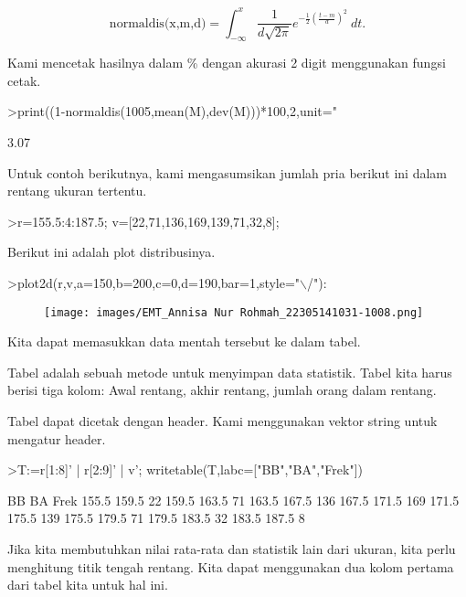 \documentclass[a4paper,10pt]{article}
\begin{document}
\begin{eulernotebook}
\begin{eulercomment}
\begin{eulercomment}
\begin{eulercomment}
\begin{eulercomment}
\begin{eulercomment}
\end{eulercomment}
\begin{eulerformula}
\[
\text{normaldis(x,m,d)}=\int_{-\infty}^x \frac{1}{d\sqrt{2\pi}}e^{-\frac{1}{2}(\frac{t-m}{d})^2}\ dt.
\]
\end{eulerformula}
\begin{eulercomment}
Kami mencetak hasilnya dalam \% dengan akurasi 2 digit menggunakan
fungsi cetak.
\end{eulercomment}
\begin{eulerprompt}
>print((1-normaldis(1005,mean(M),dev(M)))*100,2,unit=" %
\end{eulerprompt}
\begin{euleroutput}
        3.07 %
\end{euleroutput}
\begin{eulercomment}
Untuk contoh berikutnya, kami mengasumsikan jumlah pria berikut ini
dalam rentang ukuran tertentu.
\end{eulercomment}
\begin{eulerprompt}
>r=155.5:4:187.5; v=[22,71,136,169,139,71,32,8];
\end{eulerprompt}
\begin{eulercomment}
Berikut ini adalah plot distribusinya.
\end{eulercomment}
\begin{eulerprompt}
>plot2d(r,v,a=150,b=200,c=0,d=190,bar=1,style="\(\backslash\)/"):
\end{eulerprompt}
\begin{figure}[h]
    \centering
    \texttt{[image: images/EMT\_Annisa Nur Rohmah\_22305141031-1008.png]}
\end{figure}
\begin{eulercomment}
Kita dapat memasukkan data mentah tersebut ke dalam tabel.

Tabel adalah sebuah metode untuk menyimpan data statistik. Tabel kita
harus berisi tiga kolom: Awal rentang, akhir rentang, jumlah orang
dalam rentang.

Tabel dapat dicetak dengan header. Kami menggunakan vektor string
untuk mengatur header.
\end{eulercomment}
\begin{eulerprompt}
>T:=r[1:8]' | r[2:9]' | v'; writetable(T,labc=["BB","BA","Frek"])
\end{eulerprompt}
\begin{euleroutput}
          BB        BA      Frek
       155.5     159.5        22
       159.5     163.5        71
       163.5     167.5       136
       167.5     171.5       169
       171.5     175.5       139
       175.5     179.5        71
       179.5     183.5        32
       183.5     187.5         8
\end{euleroutput}
\begin{eulercomment}
Jika kita membutuhkan nilai rata-rata dan statistik lain dari ukuran,
kita perlu menghitung titik tengah rentang. Kita dapat menggunakan dua
kolom pertama dari tabel kita untuk hal ini.


\end{eulercomment}
\end{eulercomment}
\end{eulercomment}
\end{eulercomment}
\end{eulercomment}
\end{eulernotebook}
\end{document}
